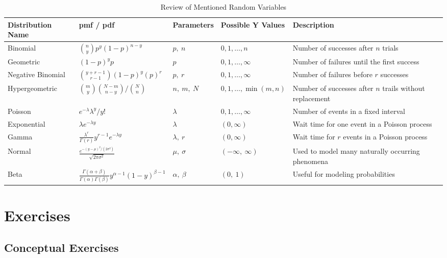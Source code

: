 \documentclass[
]{krantz}
\begin{document}
\begin{table}[t]

\caption{\label{tab:distTable}Review of Mentioned Random Variables}
\centering
\begin{tabular}{llll>{\raggedright\arraybackslash}p{10em}}
\toprule
Distribution Name & pmf / pdf & Parameters & Possible Y Values & Description\\
\midrule
Binomial & ${n \choose y} p^y (1-p)^{n-y}$ & $p,\ n$ & $0, 1, \ldots , n$ & Number of successes after $n$ trials\\
Geometric & $(1-p)^yp$ & $p$ & $0, 1, \ldots, \infty$ & Number of failures until the first success\\
Negative Binomial & ${y + r - 1\choose r-1} (1-p)^{y}(p)^r$ & $p,\ r$ & $0, 1, \ldots, \infty$ & Number of failures before $r$ successes\\
Hypergeometric & ${m \choose y}{N-m \choose n-y}\big/{N \choose n}$ & $n,\ m,\ N$ & $0, 1, \ldots , \min(m,n)$ & Number of successes after $n$ trails without replacement\\
Poisson & ${e^{-\lambda}\lambda^y}\big/{y!}$ & $\lambda$ & $0, 1, \ldots, \infty$ & Number of events in a fixed interval\\
\addlinespace
Exponential & $\lambda e^{-\lambda y}$ & $\lambda$ & $(0, \infty)$ & Wait time for one event in a Poisson process\\
Gamma & $\displaystyle\frac{\lambda^r}{\Gamma(r)} y^{r-1} e^{-\lambda y}$ & $\lambda, \ r$ & $(0, \infty)$ & Wait time for $r$ events in a Poisson process\\
Normal & $\displaystyle\frac{e^{-(y-\mu)^2/ (2 \sigma^2)}}{\sqrt{2\pi\sigma^2}}$ & $\mu,\ \sigma$ & $(-\infty,\ \infty)$ & Used to model many naturally occurring phenomena\\
Beta & $\frac{\Gamma(\alpha + \beta)}{\Gamma(\alpha)\Gamma(\beta)} y^{\alpha-1} (1-y)^{\beta-1}$ & $\alpha,\ \beta$ & $(0,\ 1)$ & Useful for modeling probabilities\\
\bottomrule
\end{tabular}
\end{table}

\hypertarget{exercises-2}{%
\section{Exercises}\label{exercises-2}}

\hypertarget{conceptual-exercises-2}{%
\subsection{Conceptual Exercises}\label{conceptual-exercises-2}}
\end{document}
